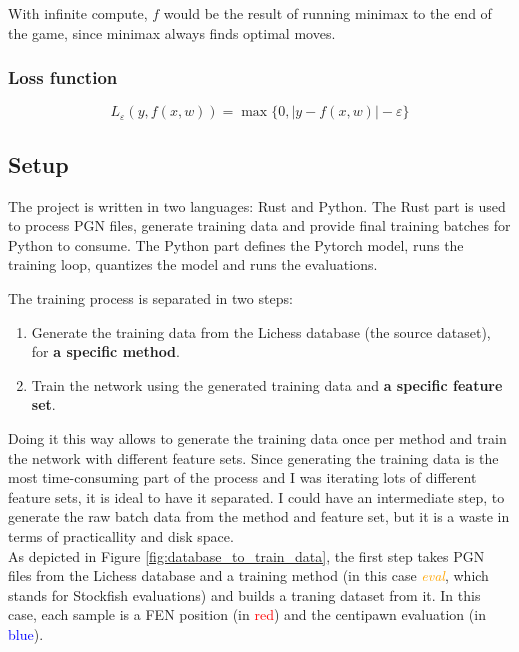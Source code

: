 With infinite compute, $f$ would be the result of running minimax to the end of the game, since minimax always finds optimal moves.


\subsubsection{Loss function}


\[
L_\varepsilon(y,f(x,w))=
\max\{0, |y-f(x,w)|-\varepsilon\}
\]


\subsection{Setup}

The project is written in two languages: Rust and Python. The Rust part is used to process PGN files, generate training data and provide final training batches for Python to consume. The Python part defines the Pytorch model, runs the training loop, quantizes the model and runs the evaluations.

The training process is separated in two steps:

\begin{enumerate}
\item Generate the training data from the Lichess database (the source dataset), for \textbf{a specific method}.
\item Train the network using the generated training data and \textbf{a specific feature set}.
\end{enumerate}

Doing it this way allows to generate the training data once per method and train the network with different feature sets. Since generating the training data is the most time-consuming part of the process and I was iterating lots of different feature sets, it is ideal to have it separated. I could have an intermediate step, to generate the raw batch data from the method and feature set, but it is a waste in terms of practicallity and disk space. \\

As depicted in Figure \ref{fig:database_to_train_data}, the first step takes PGN files from the Lichess database and a training method (in this case \textcolor{orange}{\textit{eval}}, which stands for Stockfish evaluations) and builds a traning dataset from it. In this case, each sample is a FEN position (in \textcolor{red}{red}) and the centipawn evaluation (in \textcolor{blue}{blue}). \\

